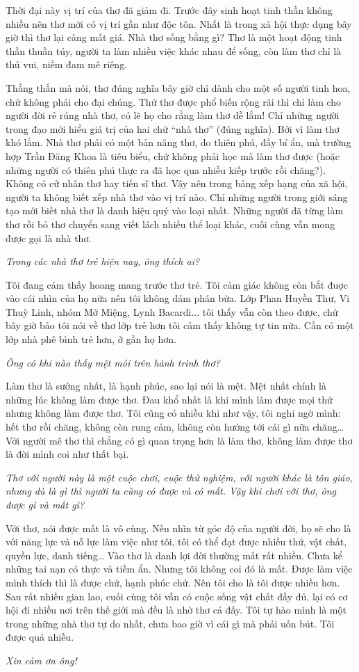 \documentclass[../main.tex]{subfiles}
\begin{document}
\begin{multicols}{2}
Thời đại này vị trí của thơ đã giảm đi. Trước đây sinh hoạt tinh thần không nhiều nên thơ mới có vị trí gần như độc tôn. Nhất là trong xã hội thực dụng bây giờ thì thơ lại càng mất giá. Nhà thơ sống bằng gì? Thơ là một hoạt động tinh thần thuần túy, người ta làm nhiều việc khác nhau để sống, còn làm thơ chỉ là thú vui, niềm đam mê riêng.  
 
Thắng thắn mà nói, thơ đúng nghĩa bây giờ chỉ dành cho một số người tinh hoa, chứ không phải cho đại chúng. Thứ thơ được phổ biến rộng rãi thì chỉ làm cho người đời rẻ rúng nhà thơ, có lẽ họ cho rằng làm thơ dễ lắm! Chỉ những người trong đạo mới hiểu giá trị của hai chữ “nhà thơ” (đúng nghĩa). Bởi vì làm thơ khó lắm. Nhà thơ phải có một bản năng thơ, do thiên phú, đầy bí ẩn, mà trường hợp Trần Đăng Khoa là tiêu biểu, chứ không phải học mà làm thơ được (hoặc những người có thiên phú thực ra đã học qua nhiều kiếp trước rồi chăng?). Không có cử nhân thơ hay tiến sĩ thơ. Vậy nên trong bảng xếp hạng của xã hội, người ta không biết xếp nhà thơ vào vị trí nào. Chỉ những người trong giới sáng tạo mới biết nhà thơ là danh hiệu quý vào loại nhất. Những người đã từng làm thơ rồi bỏ thơ chuyển sang viết lách nhiều thể loại khác, cuối cùng vẫn mong được gọi là nhà thơ.  
 
\textit{Trong các nhà thơ trẻ hiện nay, ông thích ai?} 
 
Tôi đang cảm thấy hoang mang trước thơ trẻ. Tôi cảm giác không còn bắt đuợc vào cái nhìn của họ nữa nên tôi không dám phán bừa. Lớp Phan Huyền Thư, Vi Thuỳ Linh, nhóm Mở Miệng, Lynh Bacardi... tôi thấy vẫn còn theo được, chứ bây giờ bảo tôi nói về thơ lớp trẻ hơn tôi cảm thấy không tự tin nữa. Cần có một lớp nhà phê bình trẻ hơn, ở gần họ hơn.  
 
\textit{Ông có khi nào thấy mệt mỏi trên hành trình thơ?} 
 
Làm thơ là sướng nhất, là hạnh phúc, sao lại nói là mệt. Mệt nhất chính là những lúc không làm được thơ. Đau khổ nhất là khi mình làm được mọi thứ nhưng không làm được thơ. Tôi cũng có nhiều khi như vậy, tôi nghi ngờ mình: hết thơ rồi chăng, không còn rung cảm, không còn hướng tới cái gì nữa chăng… Với người mê thơ thì chẳng có gì quan trọng hơn là làm thơ, không làm được thơ là đời mình coi như thất bại.  
 
\textit{Thơ với người này là một cuộc chơi, cuộc thử nghiệm, với người khác là tôn giáo, nhưng dù là gì thì người ta cũng có được và có mất. Vậy khi chơi với thơ, ông được gì và mất gì?} 
 
Với thơ, nói được mất là vô cùng. Nếu nhìn từ góc độ của người đời, họ sẽ cho là với năng lực và nỗ lực làm việc như tôi, tôi có thể đạt được nhiều thứ, vật chất, quyền lực, danh tiếng… Vào thơ là danh lợi đời thường mất rất nhiều. Chưa kể những tai nạn có thực và tiềm ẩn. Nhưng tôi không coi đó là mất. Được làm việc mình thích thì là được chứ, hạnh phúc chứ. Nên tôi cho là tôi được nhiều hơn. Sau rất nhiều gian lao, cuối cùng tôi vẫn có cuộc sống vật chất đầy đủ, lại có cơ hội đi nhiều nơi trên thế giới mà đều là nhờ thơ cả đấy. Tôi tự hào mình là một trong những nhà thơ tự do nhất, chưa bao giờ vì cái gì mà phải uốn bút. Tôi được quá nhiều. 
 
\textit{Xin cảm ơn ông!} 
\end{multicols}
\end{document}

